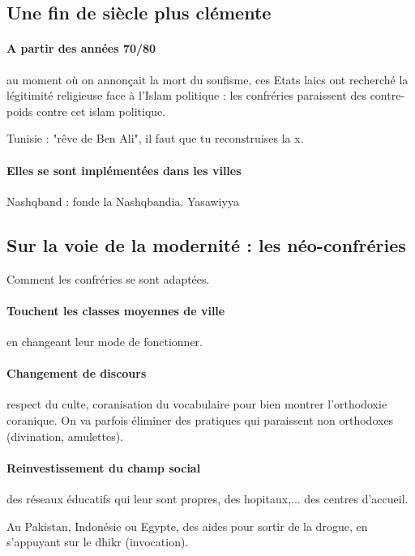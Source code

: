 \subsection{Une fin de siècle plus clémente}

\paragraph{A partir des années 70/80} au moment où on annonçait la mort du soufisme, ces Etats laics ont recherché la légitimité religieuse face à l'Islam politique : les confréries paraissent des contre-poids contre cet islam politique.
\begin{Ex}
Tunisie : "rêve de Ben Ali", il faut que tu reconstruises la x. 

\end{Ex}
\paragraph{Elles se sont implémentées dans les villes}
Nashqband : fonde la Nashqbandia.
Yasawiyya


\subsection{Sur la voie de la modernité : les néo-confréries}
Comment les confréries se sont adaptées.
\paragraph{Touchent les classes moyennes de ville} en changeant leur mode de fonctionner.

\paragraph{Changement de discours} respect du culte, coranisation du vocabulaire pour bien montrer l'orthodoxie coranique.  On va parfois éliminer des pratiques qui paraissent non orthodoxes (divination, amulettes).

\paragraph{Reinvestissement du champ social} des réseaux éducatifs qui leur sont propres, des hopitaux,... des centres d'accueil. 
\begin{Ex}
Au Pakistan, Indonésie ou Egypte, des aides pour sortir de la drogue, en s'appuyant sur le dhikr (invocation).
\end{Ex}



